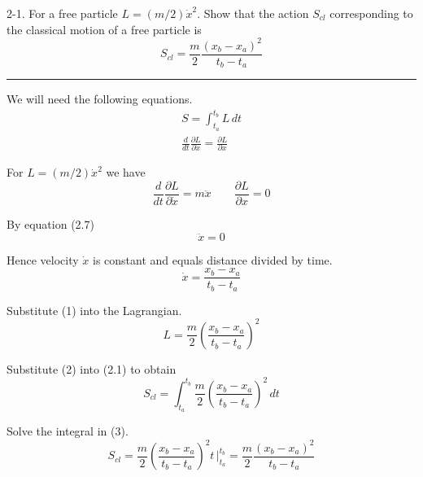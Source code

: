 \documentclass[12pt]{article}
\begin{document}
2-1.
For a free particle $L=(m/2)\dot x^2.$
Show that the action $S_{cl}$ corresponding to the classical motion
of a free particle is
\begin{equation*}
S_{cl}=\frac{m}{2}\frac{(x_b-x_a)^2}{t_b-t_a}
\tag{2.8}
\end{equation*}

\bigskip
\hrule

\bigskip
We will need the following equations.
\begin{gather*}
S=\int_{t_a}^{t_b} L\,dt
\tag{2.1}
\\
\frac{d}{dt}\frac{\partial L}{\partial\dot x}=\frac{\partial L}{\partial x}
\tag{2.7}
\end{gather*}

For $L=(m/2)\dot x^2$ we have
\begin{equation*}
\frac{d}{dt}\frac{\partial L}{\partial\dot x}=m\ddot x
\qquad
\frac{\partial L}{\partial x}=0
\end{equation*}

By equation (2.7)
\begin{equation*}
\ddot x=0
\end{equation*}

Hence velocity $\dot x$ is constant and equals distance divided by time.
\begin{equation*}
\dot x=\frac{x_b-x_a}{t_b-t_a}
\tag{1}
\end{equation*}

Substitute (1) into the Lagrangian.
\begin{equation*}
L=\frac{m}{2}\left(\frac{x_b-x_a}{t_b-t_a}\right)^2
\tag{2}
\end{equation*}

Substitute (2) into (2.1) to obtain
\begin{equation*}
S_{cl}=\int_{t_a}^{t_b}\frac{m}{2}\left(\frac{x_b-x_a}{t_b-t_a}\right)^2\,dt
\tag{3}
\end{equation*}

Solve the integral in (3).
\begin{equation*}
S_{cl}
=\frac{m}{2}\left(\frac{x_b-x_a}{t_b-t_a}\right)^2 t\,\bigg|_{t_a}^{t_b}
=\frac{m}{2}\frac{(x_b-x_a)^2}{t_b-t_a}
\end{equation*}
\end{document}
